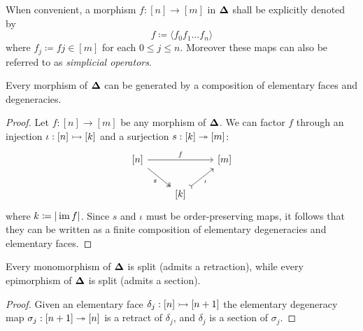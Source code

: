 \begin{notation}
    \label{not:simplex-morphisms}
    When convenient, a morphism \(f: [n] \to [m]\) in \({\mathbf{\Delta}}\) shall be explicitly
    denoted by
    \[
        f \coloneq \langle f_0 f_1 \dots f_n \rangle
    \]
    where \(f_j \coloneq f j \in [m]\) for each \(0 \leq j \leq n\). Moreover these
    maps can also be referred to as \emph{simplicial operators}.
\end{notation}

\begin{lemma}
    \label{lem:elementary-maps-generate-simplex-maps}
    Every morphism of \({\mathbf{\Delta}}\) can be generated by a composition of elementary
    faces and degeneracies.
\end{lemma}

\begin{proof}
    Let \(f: [n] \to [m]\) be any morphism of \({\mathbf{\Delta}}\). We can factor \(f\) through
    an injection \(\iota: [n] \rightarrowtail [k]\) and a surjection \(s: [k] \twoheadrightarrow [m]\):
    \[
        \begin{tikzcd}
            {[n]} \ar[rr, "f"] \ar[dr, two heads, "s"'] &&{[m]} \\
            &{[k]} \ar[ru, tail, "\iota"'] &
        \end{tikzcd}
    \]
    where \(k \coloneq |\operatorname{im} f|\). Since \(s\) and \(\iota\) must be order-preserving
    maps, it follows that they can be written as a finite composition of elementary
    degeneracies and elementary faces.
\end{proof}

\begin{corollary}
    \label{cor:mono-and-epi-in-Splx-are-split-mono-and-epi}
    Every monomorphism of \({\mathbf{\Delta}}\) is split (admits a retraction),
    while every epimorphism of \({\mathbf{\Delta}}\) is split (admits a section).
\end{corollary}

\begin{proof}
    Given an elementary face \(\delta_j: [n] \rightarrowtail [n+1]\) the elementary degeneracy
    map \(\sigma_j: [n+1] \twoheadrightarrow [n]\) is a retract of \(\delta_j\), and \(\delta_j\)
    is a section of \(\sigma_j\).
\end{proof}

